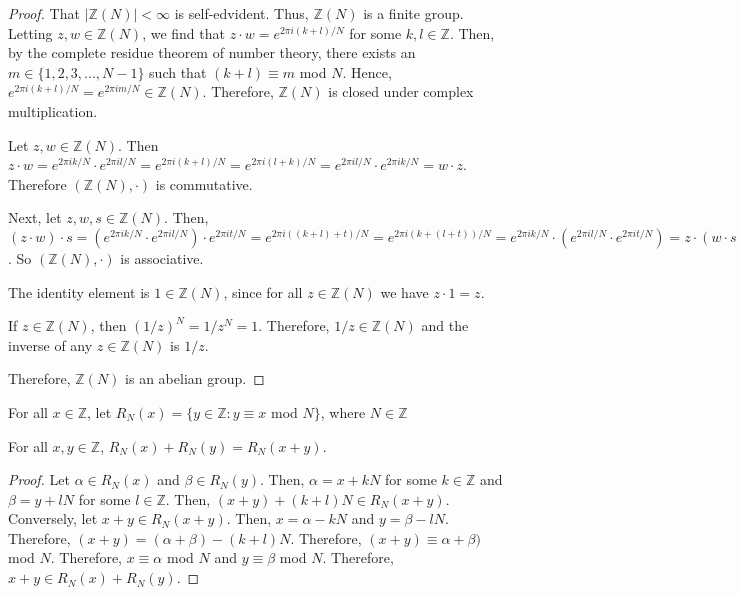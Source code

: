 \documentclass[../article.tex]{subfiles}
\begin{document}
\begin{proof}
That $| \mathbb{Z}(N)| < \infty$ is self-edvident. Thus, $\mathbb{Z}(N)$ is a finite group. Letting $z,w \in \mathbb{Z}(N)$, we find that $z \cdot w = e^{2 \pi i (k+l)/N}$ for some $k,l \in \mathbb{Z}$. Then, by the complete residue theorem of number theory, there exists an $m \in \{1, 2, 3, ..., N-1\}$ such that $(k+l) \equiv m$ mod $N$. Hence, $e^{2 \pi i (k+l)/N} = e^{2 \pi i m/N} \in \mathbb{Z}(N)$. Therefore, $\mathbb{Z}(N)$ is closed under complex multiplication.\newline

Let $z,w \in \mathbb{Z}(N)$. Then $z \cdot w = e^{2 \pi i k/N} \cdot e^{2 \pi i l/N} = e^{2 \pi i (k+l)/N} = e^{2 \pi i (l+k)/N} = e^{2 \pi i l/N} \cdot e^{2 \pi i k/N} = w \cdot z$. Therefore $(\mathbb{Z}(N), \cdot)$ is commutative.\newline

Next, let $z,w,s \in \mathbb{Z}(N)$. Then, $(z \cdot w) \cdot s = (e^{2 \pi i k/N} \cdot e^{2 \pi i l/N}) \cdot e^{2 \pi i t/N} = e^{2 \pi i ((k+l)+t)/N} = e^{2 \pi i (k+(l+t))/N} = e^{2 \pi i k/N} \cdot (e^{2 \pi i l/N} \cdot e^{2 \pi i t/N}) = z \cdot (w \cdot s)$. So $(\mathbb{Z}(N), \cdot)$ is associative.\newline

The identity element is $1 \in \mathbb{Z}(N)$, since for all $z \in \mathbb{Z}(N)$ we have $z \cdot 1 = z$.\newline

If $z \in \mathbb{Z}(N)$, then $(1/z)^N = 1/ z^N = 1$. Therefore, $1/z \in \mathbb{Z}(N)$ and the inverse of any $z \in \mathbb{Z}(N)$ is $1/z$.\newline

Therefore, $\mathbb{Z}(N)$ is an abelian group.
\end{proof}

\begin{definition}
For all $x \in \mathbb{Z}$, let $R_N (x) = \{y \in \mathbb{Z} : y \equiv x  $ mod $  N\}$, where $N \in \mathbb{Z}$
\end{definition}
\begin{theorem}
For all $x,y \in \mathbb{Z}$, $R_N (x) + R_N (y) = R_N (x+y).$
\end{theorem}
\begin{proof}
Let $\alpha \in R_N (x)$ and $\beta \in R_N (y)$. Then, $\alpha = x +kN$ for some $k \in \mathbb{Z}$ and $\beta = y + lN$ for some $l \in \mathbb{Z}$. Then, $(x+y)+(k+l)N \in R_N (x+y)$. Conversely, let $x+y \in R_N (x+y)$. Then, $x = \alpha -kN$ and $y = \beta -lN$. Therefore, $(x+y) = (\alpha + \beta) -(k+l)N$. Therefore, $(x+y) \equiv \alpha +\beta)$ mod $N$. Therefore, $x \equiv \alpha$ mod $N$ and $y \equiv \beta$ mod $N$. Therefore, $x+y \in R_N (x) + R_N (y)$.
\end{proof}
\end{document}
